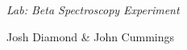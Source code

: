 {\LARGE {\em \noindent Lab: Beta Spectroscopy Experiment}}

\large{\noindent Josh Diamond \& John Cummings}

